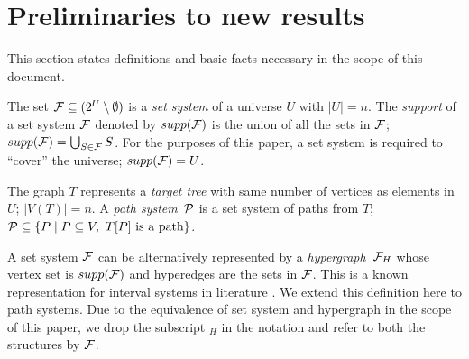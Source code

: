 \documentclass[MS]             %
              {iitmdiss_as}    %
\begin{document}




\section{Preliminaries to new results}
\label{ch:prelims} 

This
section states definitions and basic facts necessary in the scope of
this document.


The set ${\mathcal F} \subseteq (2^{U} \setminus \emptyset)$ is a {\em set
  system} of a universe $U$ with $|U| = n$.  The {\em support} of a
set system ${\mathcal F}$ denoted by $supp({\cal F})$ is the union of all the sets in
${\mathcal F}$; $supp({\mathcal F}) = \bigcup_{S \in {\mathcal F}}S$. For the purposes of this
paper, a set system is required to ``cover'' the universe; $
supp({\cal F}) = U$.

The graph $T$ represents a {\em target tree} with same
number of vertices as elements in $U$; $|V(T)| = n$.  A {\em path
  system}\, ${\cal P}$ is a set system of paths from $T$; ${\cal P} \subseteq \{P
\mid P \subseteq V, \text{ } T[P] \text{ is a path} \}$.

% 

A set system ${\cal F}$ can be alternatively represented by a {\em
  hypergraph}\, ${\cal F}_H$ whose vertex set is $supp({\cal F})$ and hyperedges
are the sets in ${\cal F}$. This is a known representation for interval
systems in literature \cite{bls99,kklv10}.  We extend this definition here to
path systems. Due to the equivalence of set system and hypergraph in
the scope of this paper, we drop the
subscript $_H$ in the notation and refer to both the structures by ${\cal F}$.
\end{document}
